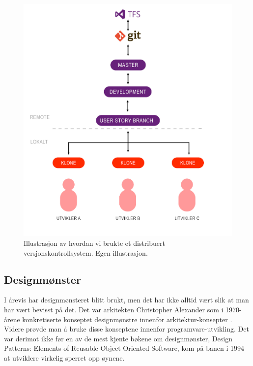 \begin{figure}[H] 
    \centering
    \includegraphics[width=\textwidth]{figures/Tekniske-valg/Utvikling/TFS.jpg}
    \caption{Illustrasjon av hvordan vi brukte et distribuert versjonskontrollsystem. Egen illustrasjon.}
    \label{Illustrasjon_versjonskontroll}
\end{figure}

\subsection{\textbf{Designmønster}}

I årevis har designmønsteret blitt brukt, men det har ikke alltid vært slik at man har vært bevisst på det. Det var arkitekten Christopher Alexander som i 1970-årene konkretiserte konseptet designmønstre innenfor arkitektur-konsepter \cite{christopheralexander}. Videre prøvde man å bruke disse konseptene innenfor programvare-utvikling. Det var derimot ikke før en av de mest kjente bøkene om designmønster,   
Design Patterns: Elements of Reusable Object-Oriented Software, kom på banen i 1994 at utviklere virkelig sperret opp øynene. 


